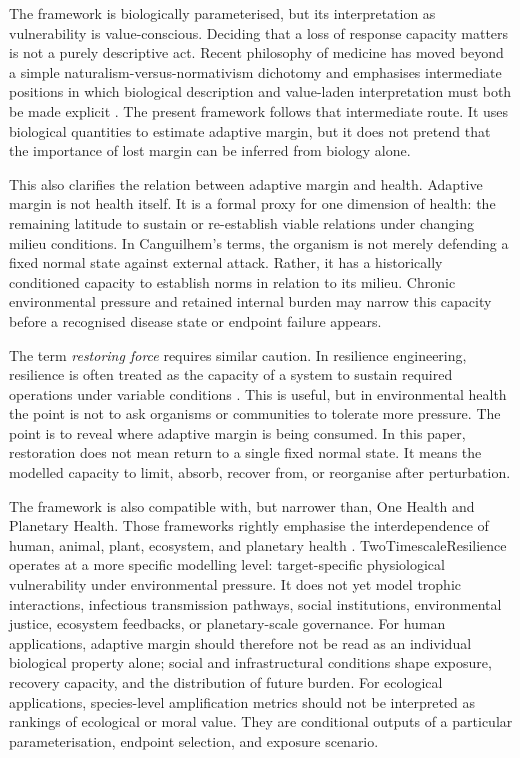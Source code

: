 The framework is biologically parameterised, but its interpretation as vulnerability is value-conscious. Deciding that a loss of response capacity matters is not a purely descriptive act. Recent philosophy of medicine has moved beyond a simple naturalism-versus-normativism dichotomy and emphasises intermediate positions in which biological description and value-laden interpretation must both be made explicit \citep{thorell2024between,amoretti2022value}. The present framework follows that intermediate route. It uses biological quantities to estimate adaptive margin, but it does not pretend that the importance of lost margin can be inferred from biology alone.

This also clarifies the relation between adaptive margin and health. Adaptive margin is not health itself. It is a formal proxy for one dimension of health: the remaining latitude to sustain or re-establish viable relations under changing milieu conditions. In Canguilhem's terms, the organism is not merely defending a fixed normal state against external attack. Rather, it has a historically conditioned capacity to establish norms in relation to its milieu. Chronic environmental pressure and retained internal burden may narrow this capacity before a recognised disease state or endpoint failure appears.

The term \emph{restoring force} requires similar caution. In resilience engineering, resilience is often treated as the capacity of a system to sustain required operations under variable conditions \citep{hollnagel2013resilient}. This is useful, but in environmental health the point is not to ask organisms or communities to tolerate more pressure. The point is to reveal where adaptive margin is being consumed. In this paper, restoration does not mean return to a single fixed normal state. It means the modelled capacity to limit, absorb, recover from, or reorganise after perturbation.

The framework is also compatible with, but narrower than, One Health and Planetary Health. Those frameworks rightly emphasise the interdependence of human, animal, plant, ecosystem, and planetary health \citep{rabinowitz2018planetary,ruiz2023onehealth}. TwoTimescaleResilience operates at a more specific modelling level: target-specific physiological vulnerability under environmental pressure. It does not yet model trophic interactions, infectious transmission pathways, social institutions, environmental justice, ecosystem feedbacks, or planetary-scale governance. For human applications, adaptive margin should therefore not be read as an individual biological property alone; social and infrastructural conditions shape exposure, recovery capacity, and the distribution of future burden. For ecological applications, species-level amplification metrics should not be interpreted as rankings of ecological or moral value. They are conditional outputs of a particular parameterisation, endpoint selection, and exposure scenario.

